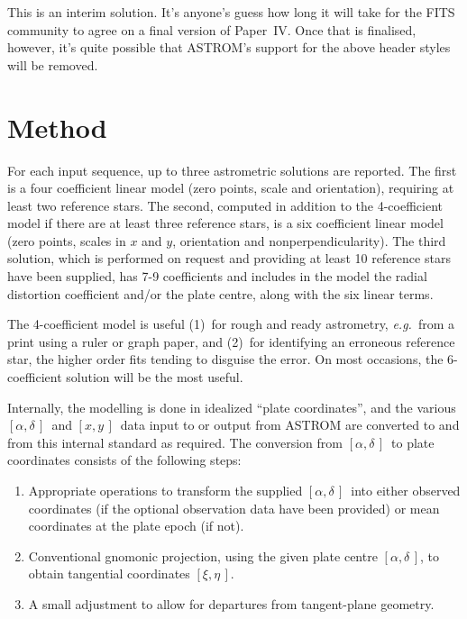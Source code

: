 \documentclass[twoside,11pt]{article}
\newcommand{\xlabel}[1]{}
\renewcommand{\_}{\texttt{\symbol{95}}}
\newcommand{\radec}     {$[\alpha,\delta\,]$}
\newcommand{\xy}        {$[x,y\,]$}
\newcommand{\xieta}     {$[\xi,\eta\,]$}
\begin{document}
This is an interim solution.  It's anyone's guess how long it will
take for the FITS community to agree on a final version of Paper~IV.
Once that is finalised, however, it's quite possible that ASTROM's
support for the above header styles will be removed.

\section{\xlabel{method}Method}
\label{method}

For each input sequence, up to three astrometric solutions are
reported. The first is a four coefficient linear model (zero points,
scale and orientation), requiring at least two reference stars.
The second, computed in addition to the 4-coefficient model if there
are at least three reference stars, is a six coefficient linear model
(zero points, scales in $x$ and $y$, orientation and nonperpendicularity).
The third solution, which is performed on request and providing at least
10 reference stars have been supplied, has 7-9 coefficients and includes
in the model the radial distortion coefficient and/or the plate centre,
along with the six linear terms.

The 4-coefficient model is useful (1)~for rough and ready astrometry,
\textit{e.g.}\ from a print using a ruler or graph paper, and (2)~for
identifying an erroneous reference star, the higher order fits tending
to disguise the error.  On most occasions, the 6-coefficient solution
will be the most useful.

Internally, the modelling is done in idealized ``plate coordinates'',
and the various \radec\ and \xy\ data input to or output from ASTROM are
converted to and from this internal standard as required.  The conversion
from \radec\ to plate coordinates consists of the following steps:

\begin{enumerate}

\item Appropriate operations to transform the supplied \radec\ into either
observed coordinates (if the optional observation data have been provided)
or mean coordinates at the plate epoch (if not).

\item Conventional gnomonic projection, using the given plate centre
\radec, to obtain tangential coordinates \xieta.

\item A small adjustment to allow for departures from tangent-plane
geometry.

\end{enumerate}
\end{document}
